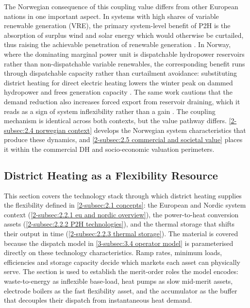 The Norwegian consequence of this coupling value differs from other European nations in one important aspect. In systems with high shares of variable renewable generation (VRE), the primary system-level benefit of P2H is the absorption of surplus wind and solar energy which would otherwise be curtailed, thus raising the achievable penetration of renewable generation \cite{geabermudez_role_2021}. In Norway, where the dominating marginal power unit is dispatchable hydropower reservoirs rather than non-dispatchable variable renewables, the corresponding benefit runs through dispatchable capacity rather than curtailment avoidance: substituting district heating for direct electric heating lowers the winter peak on dammed hydropower and frees generation capacity \cite{askeland_balancing_2019}. The same work cautions that the demand reduction also increases forced export from reservoir draining, which it reads as a sign of system inflexibility rather than a gain \cite{askeland_balancing_2019}. The coupling mechanism is identical across both contexts, but the value pathway differs. \autoref{2-subsec:2.4 norwegian context} develops the Norwegian system characteristics that produce these dynamics, and \autoref{2-subsec:2.5 commercial and societal value} places it within the commercial DH and socio-economic valuation perimeters.


\subsection{District Heating as a Flexibility Resource}
\label{2-subsec:2.2 DH as flexibility}

This section covers the technology stack through which district heating supplies the flexibility defined in \autoref{2-subsec:2.1 concepts}: the European and Nordic system context (\autoref{2-subsec:2.2.1 eu and nordic overview}), the power-to-heat conversion assets (\autoref{2-subsec:2.2.2 P2H technologies}), and the thermal storage that shifts their output in time (\autoref{2-subsec:2.2.3 thermal storage}). The material is covered because the dispatch model in \autoref{3-subsec:3.4 operator model} is parameterised directly on these technology characteristics. Ramp rates, minimum loads, efficiencies and storage capacity decide which markets each asset can physically serve. The section is used to establish the merit-order roles the model encodes: waste-to-energy as inflexible base-load, heat pumps as slow mid-merit assets, electrode boilers as the fast flexibility asset, and the accumulator as the buffer that decouples their dispatch from instantaneous heat demand.

